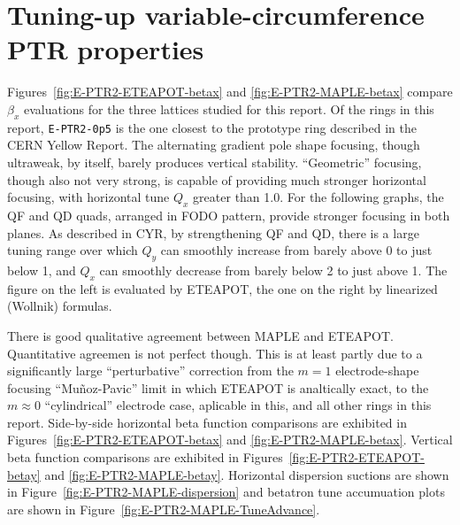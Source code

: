 \documentclass[]{article}
\begin{document}
\section{Tuning-up variable-circumference PTR properties}
Figures~\ref{fig:E-PTR2-ETEAPOT-betax} and 
        \ref{fig:E-PTR2-MAPLE-betax}
compare $\beta_x$ evaluations for the three lattices studied
for this report. Of the rings in this report, {\tt E-PTR2-0p5} is the 
one closest to the prototype ring described in the CERN Yellow Report. 
The alternating gradient pole shape
focusing, though ultraweak, by itself, barely produces vertical stability.
``Geometric'' focusing, though also not very strong, is capable of
providing much stronger horizontal focusing, with horizontal tune $Q_x$
greater than 1.0. For the following graphs, the
QF and QD quads, arranged in FODO pattern, provide stronger focusing
in both planes. As described in CYR, by strengthening QF and QD, there is a large 
tuning range over which $Q_y$ can smoothly increase from barely above 0 to just below 1,
and $Q_x$ can smoothly decrease from barely below 2 to just above 1.   
The figure on the left is evaluated by ETEAPOT, the one on the right by linearized (Wollnik) 
formulas.

There is good qualitative agreement between MAPLE and ETEAPOT.
Quantitative agreemen is not perfect though. This is at least partly
due to a significantly large ``perturbative'' correction from the 
$m=1$ electrode-shape focusing ``Mu\~noz-Pavic'' limit in which ETEAPOT is analtically
exact, to the $m\approx0$ ``cylindrical'' electrode case, aplicable in this,
and all other rings in this report. Side-by-side horizontal beta function comparisons 
are exhibited in Figures~\ref{fig:E-PTR2-ETEAPOT-betax} and \ref{fig:E-PTR2-MAPLE-betax}.
Vertical beta function comparisons are exhibited in Figures~\ref{fig:E-PTR2-ETEAPOT-betay} 
and \ref{fig:E-PTR2-MAPLE-betay}. Horizontal dispersion suctions are shown in
Figure~\ref{fig:E-PTR2-MAPLE-dispersion} and betatron tune accumuation plots are 
shown in Figure~\ref{fig:E-PTR2-MAPLE-TuneAdvance}.
\end{document}
